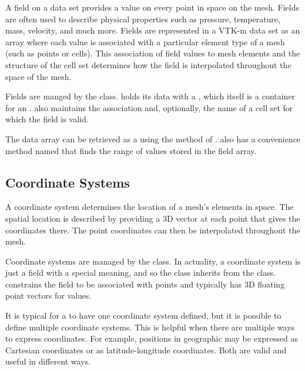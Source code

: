 A field on a data set provides a value on every point in space on the mesh.
Fields are often used to describe physical properties such as pressure,
temperature, mass, velocity, and much more. Fields are represented in a
VTK-m data set as an array where each value is associated with a particular
element type of a mesh (such as points or cells). This association of field
values to mesh elements and the structure of the cell set determines how
the field is interpolated throughout the space of the mesh.

Fields are manged by the  class. 
holds its data with a , which itself is
a container for an . 
also maintains the association and, optionally, the name of a cell set for
which the field is valid.

The data array can be retrieved as a 
using the  method of .
 also has a convenience method named
 that finds the range of values stored in the field
array.


\subsection{Coordinate Systems}
\label{sec:DataSets:CoordinateSystems}


A coordinate system determines the location of a mesh's elements in space.
The spatial location is described by providing a 3D vector at each point
that gives the coordinates there. The point coordinates can then be
interpolated throughout the mesh.

Coordinate systems are managed by the  class. In
actuality, a coordinate system is just a field with a special meaning, and
so the  class inherits from the
 class.  constrains
the field to be associated with points and typically has 3D floating point
vectors for values.

It is typical for a  to have one coordinate system
defined, but it is possible to define multiple coordinate systems. This is
helpful when there are multiple ways to express coordinates. For example,
positions in geographic may be expressed as Cartesian coordinates or as
latitude-longitude coordinates. Both are valid and useful in different
ways.

